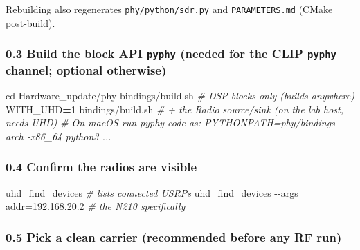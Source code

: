 \documentclass[
  9.5pt,
]{article}
\newenvironment{Shaded}{\begin{snugshade}}{\end{snugshade}}
\newcommand{\AttributeTok}[1]{\textcolor[rgb]{0.77,0.63,0.00}{#1}}
\newcommand{\BuiltInTok}[1]{#1}
\newcommand{\CommentTok}[1]{\textcolor[rgb]{0.56,0.35,0.01}{\textit{#1}}}
\newcommand{\ExtensionTok}[1]{#1}
\newcommand{\NormalTok}[1]{#1}
\newcommand{\OperatorTok}[1]{\textcolor[rgb]{0.81,0.36,0.00}{\textbf{#1}}}
\newcommand{\VariableTok}[1]{\textcolor[rgb]{0.00,0.00,0.00}{#1}}
\begin{document}
Rebuilding also regenerates \texttt{phy/python/sdr.py} and
\texttt{PARAMETERS.md} (CMake post-build).

\hypertarget{03-build-the-block-api-pyphy-needed-for-the-clip-pyphy-channel-optional-otherwise}{%
\subsubsection{\texorpdfstring{0.3 Build the block API \texttt{pyphy}
(needed for the CLIP \texttt{pyphy} channel; optional
otherwise)}{0.3 Build the block API pyphy (needed for the CLIP pyphy channel; optional otherwise)}}\label{03-build-the-block-api-pyphy-needed-for-the-clip-pyphy-channel-optional-otherwise}}

\begin{Shaded}
\begin{Highlighting}[]
\BuiltInTok{cd}\NormalTok{ Hardware\_update/phy}
\ExtensionTok{bindings/build.sh}                 \CommentTok{\# DSP blocks only (builds anywhere)}
\VariableTok{WITH\_UHD}\OperatorTok{=}\NormalTok{1 }\ExtensionTok{bindings/build.sh}      \CommentTok{\# + the Radio source/sink (on the lab host, needs UHD)}
\CommentTok{\# On macOS run pyphy code as:  PYTHONPATH=phy/bindings arch {-}x86\_64 python3 ...}
\end{Highlighting}
\end{Shaded}

\hypertarget{04-confirm-the-radios-are-visible}{%
\subsubsection{0.4 Confirm the radios are
visible}\label{04-confirm-the-radios-are-visible}}

\begin{Shaded}
\begin{Highlighting}[]
\ExtensionTok{uhd\_find\_devices}                              \CommentTok{\# lists connected USRPs}
\ExtensionTok{uhd\_find\_devices} \AttributeTok{{-}{-}args}\NormalTok{ addr=192.168.20.2     }\CommentTok{\# the N210 specifically}
\end{Highlighting}
\end{Shaded}

\hypertarget{05-pick-a-clean-carrier-recommended-before-any-rf-run}{%
\subsubsection{0.5 Pick a clean carrier (recommended before any RF
run)}\label{05-pick-a-clean-carrier-recommended-before-any-rf-run}}
\end{document}

